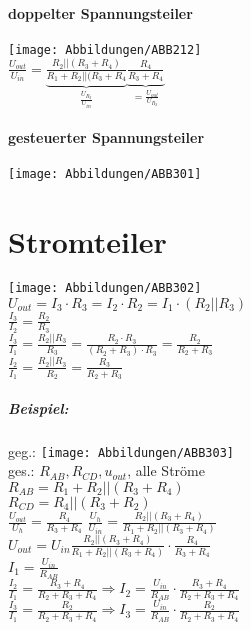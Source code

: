 \documentclass{scrreprt}
\begin{document}
\paragraph{doppelter Spannungsteiler} \parskp
\texttt{[image: Abbildungen/ABB212]}\\
$\frac{U_{out}}{U_{in}}=\underbrace{\frac{R_2|| (R_3+R_4)}{R_1+R_2||(R_3+R_4}}_{\frac{U_{R_2}}{U_{in}}} \underbrace{\frac{R_4}{R_3+R_4}}_{=\frac{U_{out}}{U_{R_2}}}$

\paragraph{gesteuerter Spannungsteiler}\parskp
\texttt{[image: Abbildungen/ABB301]}

\section{Stromteiler}

\texttt{[image: Abbildungen/ABB302]}\\
$U_{out}=I_3 \cdot R_3 = I_2 \cdot R_2 = I_1 \cdot (R_2||R_3)$\\
$\frac{I_3}{I_2}=\frac{R_2}{R_3}$\\
$\frac{I_3}{I_1}=\frac{R_2||R_3}{R_3}=\frac{R_2 \cdot R_3}{(R_2+R_3)\cdot R_3}=\frac{R_2}{R_2+R_3}$\\
$\frac{I_2}{I_1}=\frac{R_2||R_3}{R_2}=\frac{R_3}{R_2+R_3}$

\subparagraph{Beispiel:}
geg.: \texttt{[image: Abbildungen/ABB303]}\\
ges.: $R_{AB}, R_{CD}, u_{out}$, alle Ströme\medskip\\
$R_{AB}=R_1+R_2||(R_3+R_4)$\\
$R_{CD}=R_4||(R_3+R_2)$\\
$\frac{U_{out}}{U_{h}}=\frac{R_4}{R_3+R_4}$
$\frac{U_h}{U_{in}}=\frac{R_2||(R_3+R_4)}{R_1+R_2||(R_3+R_4)}$\\
$U_{out}=U_{in}\frac{R_2||(R_3+R_4)}{R_1+R_2||(R_3+R_4)}\cdot\frac{R_4}{R_3+R_4}$\\
$I_1=\frac{U_{in}}{R_{AB}}$\\
$\frac{I_2}{I_1}=\frac{R_3+R_4}{R_2+R_3+R_4} \Rightarrow I_2=\frac{U_{in}}{R_{AB}}\cdot \frac{R_3+R_4}{R_2+R_3+R_4}$\\
$\frac{I_3}{I_1}=\frac{R_2}{R_2+R_3+R_4}\Rightarrow I_3 = \frac{U_{in}}{R_{AB}}\cdot \frac{R_2}{R_2+R_3+R_4}$
\end{document}
